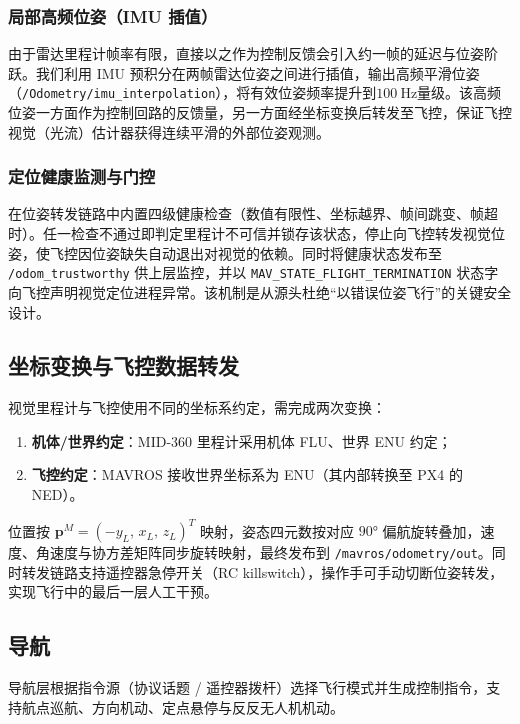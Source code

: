 \subsubsection{局部高频位姿（IMU 插值）}
由于雷达里程计帧率有限，直接以之作为控制反馈会引入约一帧的延迟与位姿阶跃。我们利用 IMU 预积分在两帧雷达位姿之间进行插值，输出高频平滑位姿（\lstinline{/Odometry/imu_interpolation}），将有效位姿频率提升到$\qty{100}{\Hz}$量级。该高频位姿一方面作为控制回路的反馈量，另一方面经坐标变换后转发至飞控，保证飞控视觉（光流）估计器获得连续平滑的外部位姿观测。

\subsubsection{定位健康监测与门控}
在位姿转发链路中内置四级健康检查（数值有限性、坐标越界、帧间跳变、帧超时）。任一检查不通过即判定里程计不可信并锁存该状态，停止向飞控转发视觉位姿，使飞控因位姿缺失自动退出对视觉的依赖。同时将健康状态发布至 \lstinline{/odom_trustworthy} 供上层监控，并以 \lstinline{MAV_STATE_FLIGHT_TERMINATION} 状态字向飞控声明视觉定位进程异常。该机制是从源头杜绝“以错误位姿飞行”的关键安全设计。

\subsection{坐标变换与飞控数据转发}
视觉里程计与飞控使用不同的坐标系约定，需完成两次变换：
\begin{enumerate}
    \item \textbf{机体/世界约定}：MID-360 里程计采用机体 FLU、世界 ENU 约定；
    \item \textbf{飞控约定}：MAVROS 接收世界坐标系为 ENU（其内部转换至 PX4 的 NED）。
\end{enumerate}
位置按 $\boldsymbol{p}^M=(-y_L,\,x_L,\,z_L)^T$ 映射，姿态四元数按对应 $\ang{90}$ 偏航旋转叠加，速度、角速度与协方差矩阵同步旋转映射，最终发布到 \lstinline{/mavros/odometry/out}。同时转发链路支持遥控器急停开关（RC killswitch），操作手可手动切断位姿转发，实现飞行中的最后一层人工干预。

\subsection{导航}
导航层根据指令源（协议话题 / 遥控器拨杆）选择飞行模式并生成控制指令，支持航点巡航、方向机动、定点悬停与反反无人机机动。

